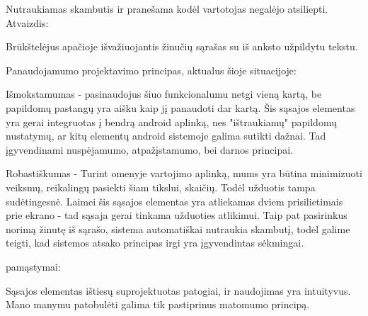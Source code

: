 ﻿\documentclass[a4paper, 12pt]{article}
\begin{document}
		Nutraukiamas skambutis ir pranešama kodėl vartotojas negalėjo atsiliepti.\newline
		Atvaizdis:

		Brūkštelėjus apačioje išvažiuojantis žinučių sąrašas su iš anksto užpildytu tekstu.\newline

		Panaudojamumo projektavimo principas, aktualus šioje situacijoje:

		Išmokstamumas - pasinaudojus šiuo funkcionalumu netgi vieną kartą, be papildomų pastangų yra aišku kaip jį panaudoti dar kartą. Šis sąsajos elementas yra gerai integruotas į bendrą android aplinką, nes "ištraukiamų" papildomų nustatymų, ar kitų elementų android sistemoje galima sutikti dažnai.
		Tad įgyvendinami nuspėjamumo, atpažįstamumo, bei darnos principai.

		Robastiškumas - Turint omenyje vartojimo aplinką, mums yra būtina minimizuoti veiksmų, reikalingų pasiekti šiam tikslui, skaičių.
		Todėl užduotis tampa sudėtingesnė. Laimei šis sąsajos elementas yra atliekamas dviem prisilietimais prie ekrano - tad sąsaja gerai tinkama užduoties atlikimui.
		Taip pat pasirinkus norimą žinutę iš sąrašo, sistema automatiškai nutraukia skambutį, todėl galime teigti, kad sistemos atsako principas irgi yra įgyvendintas sėkmingai.

		pamąstymai:

		Sąsajos elementas ištiesų suprojektuotas patogiai, ir naudojimas yra intuityvus.
		Mano manymu patobulėti galima tik pastiprinus matomumo principą. 
\end{document}
